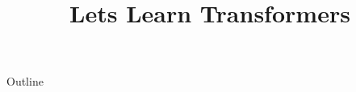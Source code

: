 \documentclass[xcolor=dvipsnames,compress,t,pdf,9pt]{beamer}
\title[\insertframenumber /\inserttotalframenumber]{Lets Learn Transformers}
\begin{document}
	\begin{frame}
	\titlepage
	\end{frame}
	
	\begin{frame}{Outline}
	    \tableofcontents
	\end{frame}

%	
	
	
\end{document}
